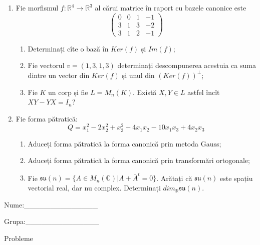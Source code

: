 \documentclass{article}
\begin{document}
\begin{enumerate}
 \item Fie morfismul $f:\mathbb{R}^4 \to \mathbb{R}^3$ al cărui matrice în raport cu bazele canonice este
$$\begin{pmatrix}
0&0&1&-1\\
3&1&3&-2\\
3&1&2&-1
\end{pmatrix}$$

\begin{enumerate}
\item Determinați cîte o bază în $Ker(f)$ și $Im(f)$;
\item Fie vectorul $v=(1,3,1,3)$ determinați descompunerea acestuia ca suma dintre un vector din $Ker(f)$ și unul din $(Ker(f))^\perp$;
\item Fie $K$ un corp și fie $L=M_n(K)$. Există $X,Y \in L$ astfel încît $XY-YX=I_n$?  
\end{enumerate}
\item Fie forma pătratică:
$$Q= x_1^2-2x_2^2+x_3^2+4x_1x_2-10x_1x_3+4x_2x_3$$

\begin{enumerate}
\item Aduceți forma pătratică la forma canonică prin metoda Gauss;
\item Aduceți forma pătratică la forma canonică prin transformări ortogonale;
\item Fie $\mathfrak{su}(n)=\{ A \in M_n(\mathbb{C}) | A+\bar{A}^t=0\}$. Arătați că $\mathfrak{su}(n)$ este spațiu vectorial real, dar nu complex.
Determinați $dim_{\mathbb{R}}\mathfrak{su}(n)$.
\end{enumerate}
\end{enumerate}
\newpage
\begin{flushright}
Nume:\_\_\_\_\_\_\_\_\_\_\_\_\_\_
 
 
Grupa:\_\_\_\_\_\_\_\_\_\_\_\_\_\_
\end{flushright}
\begin{center}
\vspace{2cm}
{\Large Probleme}
\vspace{2cm}
\end{center}
\end{document}
